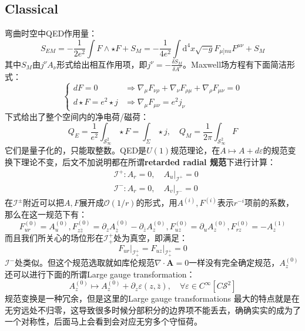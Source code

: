 \subsection{Classical}
弯曲时空中QED作用量：
\begin{equation}
	S_{EM}=-\frac{1}{2e^2}\int{F}\wedge\star F +S_M=-\frac{1}{4e^2}\int \mathrm{d}^4x\sqrt{-g}F_{\mu]nu}F^{\mu\nu}+S_M
\end{equation}
其中$S_M$由$j^\nu A_\nu$形式给出相互作用项，即$j^\nu=-\frac{\delta S_M}{\delta A^\nu}$。Maxwell场方程有下面简洁形式：
\begin{equation}
	\begin{cases}
		dF=0&\Rightarrow \nabla_\mu F_{\nu\rho}+\nabla_\nu F_{\rho\mu}+\nabla_\rho F_{\mu\nu}=0\\
		d\star F=e^2\star j&\Rightarrow \nabla_\mu F_{\mu\nu}=e^2j_\nu
	\end{cases}
\end{equation}
下式给出了整个空间内的净电荷/磁荷：
\begin{equation}
	Q_E=\frac{1}{e^2}\int_{\mathcal{S}^2_\infty}\star F=\int_{\Sigma}\star j,\quad Q_M=\frac{1}{2\pi}\int_{\mathcal{S}^2_\infty} F
\end{equation}
它们是量子化的，只能取整数。QED是$U(1)$规范理论，在$A\mapsto A+d\varepsilon$的规范变换下理论不变，后文不加说明都在所谓\textbf{retarded radial 规范}下进行计算\cite{He:2014cra}：
\begin{equation}
	\begin{aligned}
		&\mathcal{I}^+: A_r=0,\quad A_u|_{\mathcal{I}^+}=0\\
		&\mathcal{I}^-: A_r=0,\quad A_v|_{\mathcal{I}^-}=0
	\end{aligned}
\end{equation}
在$\mathcal{I}^{\pm}$附近可以把$A,F$展开成$\mathcal{O}(1/r)$的形式，用$A^{(i)},F^{(i)}$表示$r^{-i}$项前的系数，那么在这一规范下有：
\begin{equation}
	F_{ur}^{(0)}=A_u^{(0)}, F_{z\bar z}^{(0)}=\partial_z A_{\bar z}^{(0)}-\partial_{\bar z}A_z^{(0)},F_{uz}^{(0)}=\partial_u A_z^{(0)},F_{rz}^{(0)}=-A_z^{(1)}
\end{equation}
而且我们所关心的场位形在$\mathcal{I}^{+}_{+}$处为真空，即满足：
\begin{equation}
	\left.F_{ur}\right|_{\mathcal{I}_{+}^{+}}=\left.F_{uz}\right|_{\mathcal{I}_{+}^{+}}=0
\end{equation}
$\mathcal{I}^-$处类似。但这个规范选取就如库伦规范$\nabla\cdot \mathbf{A}=0$一样没有完全确定规范，$A^{(0)}_z$还可以进行下面的所谓Large gauge transformation：
\begin{equation}
	A^{(0)}_z\mapsto A^{(0)}_z+\partial_z\varepsilon(z,\bar z),\quad \forall \varepsilon\in C^\infty\left[C\mathcal{S}^2\right]
\end{equation}
规范变换是一种冗余，但是这里的Large gauge transformations 最大的特点就是在无穷远处不归零，这导致很多时候分部积分的边界项不能丢去，确确实实的成为了一个对称性，后面马上会看到会对应无穷多个守恒荷。

